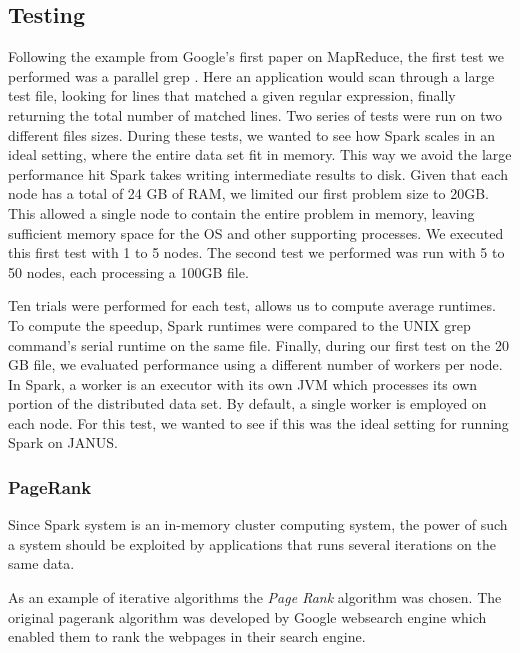 \documentclass{article}
\begin{document}
\subsection{Testing}
Following the example from Google's first paper on MapReduce, the first test we
performed was a parallel grep \citep{dean-mapreduce}. Here an application would
scan through a large test file, looking for lines that matched a given regular
expression, finally returning the total number of matched lines. Two series of
tests were run on two different files sizes. During these tests, we wanted to
see how Spark scales in an ideal setting, where the entire data set fit in
memory. This way we avoid the large performance hit Spark takes writing
intermediate results to disk. Given that each node has a total of 24 GB of RAM,
we limited our first problem size to 20GB. This allowed a single node to
contain the entire problem in memory, leaving sufficient memory space for the
OS and other supporting processes. We executed this first test with 1 to 5
nodes. The second test we performed was run with 5 to 50 nodes, each processing
a 100GB file.

Ten trials were performed for each test, allows us to compute average
runtimes. To compute the speedup, Spark runtimes were compared to the UNIX grep
command's serial runtime on the same file. Finally, during our first test on the
20 GB file, we evaluated performance using a different number of workers per
node. In Spark, a worker is an executor with its own JVM which processes its
own portion of the distributed data set. By default, a single worker is
employed on each node. For this test, we wanted to see if this was the ideal
setting for running Spark on JANUS.


\subsubsection{PageRank}   
Since Spark system is an in-memory cluster computing system, the power of such a system should be exploited by applications that runs several iterations on the same data. 

As an example of iterative algorithms the \emph{Page Rank} algorithm was chosen.
The original pagerank algorithm was developed by Google websearch engine which enabled them to rank the webpages in their search engine.
\end{document}
